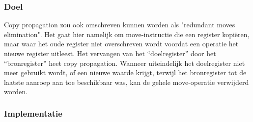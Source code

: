 \documentclass[a4paper,10pt]{article}
\begin{document}
\subsubsection{Doel}
Copy propagation zou ook omschreven kunnen worden als "redundant moves
elimination". Het gaat hier namelijk om move-instructie die een register
kopi\"eren, maar waar het oude register niet overschreven wordt voordat een
operatie het nieuwe register uitleest. Het vervangen van het ``doelregister''
door het ``bronregister'' heet copy propagation. Wanneer uiteindelijk het
doelregister niet meer gebruikt wordt, of een nieuwe waarde krijgt, terwijl het
bronregister tot de laatste aanroep aan toe beschikbaar was, kan de gehele
move-operatie verwijderd worden.

\subsubsection{Implementatie}
\end{document}
